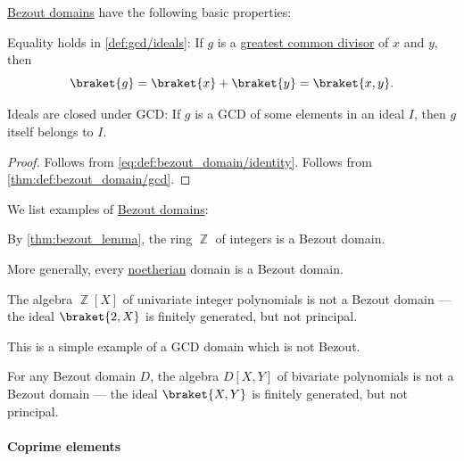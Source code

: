 \begin{proposition}\label{thm:def:bezout_domain}
  \hyperref[def:bezout_domain]{Bezout domains} have the following basic properties:
  \begin{thmenum}
     Equality holds in \cref{def:gcd/ideals}: If \( g \) is a \hyperref[def:gcd]{greatest common divisor} of \( x \) and \( y \), then
    \begin{equation*}
      \braket{ g } = \braket{ x } + \braket{ y } = \braket{ x, y }.
    \end{equation*}

     Ideals are closed under GCD: If \( g \) is a GCD of some elements in an ideal \( I \), then \( g \) itself belongs to \( I \).
  \end{thmenum}
\end{proposition}
\begin{proof}
   Follows from \eqref{eq:def:bezout_domain/identity}.
   Follows from \cref{thm:def:bezout_domain/gcd}.
\end{proof}

\begin{example}\label{ex:def:bezout_domain}
  We list examples of \hyperref[def:bezout_domain]{Bezout domains}:
  \begin{thmenum}
     By \cref{thm:bezout_lemma}, the ring \( \BbbZ \) of integers is a Bezout domain.

     More generally, every \hyperref[def:noetherian_semiring]{noetherian} domain is a Bezout domain.

     The algebra \( \BbbZ[X] \) of univariate integer polynomials is not a Bezout domain --- the ideal \( \braket{ 2, X } \) is finitely generated, but not principal.

    This is a simple example of a GCD domain which is not Bezout.

     For any Bezout domain \( D \), the algebra \( D[X, Y] \) of bivariate polynomials is not a Bezout domain --- the ideal \( \braket{ X, Y } \) is finitely generated, but not principal.
  \end{thmenum}
\end{example}

\paragraph{Coprime elements}

